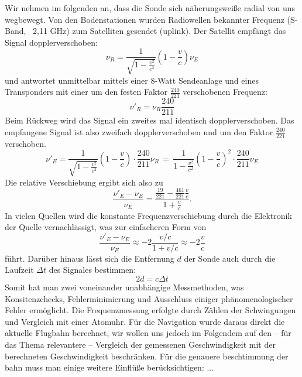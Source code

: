 \documentclass[a4paper,10pt]{article}
\begin{document}
Wir nehmen im folgenden an, dass die Sonde sich näherungsweiße radial von uns wegbewegt.
Von den Bodenstationen wurden Radiowellen bekannter Frequenz (S-Band, ~2,11 GHz) zum Satelliten gesendet (uplink).
Der Satellit empfängt das Signal dopplerverschoben:
\begin{equation}
 \nu_R = \frac{1}{\sqrt{1-\frac{v^2}{c^2}}}(1-\frac{v}{c})\nu_E
\end{equation}
und antwortet unmittelbar mittels einer 8-Watt Sendeanlage und eines Transponders
mit einer um den festen Faktor $ \frac{240}{221} $ verschobenen Frequenz:
\begin{equation}
\nu'_R = \nu_R\frac{240}{211}
\end{equation}
Beim Rückweg wird das Signal ein zweites mal identisch dopplerverschoben.
Das empfangene Signal ist also zweifach dopplerverschoben und um den Faktor $\frac{240}{221}$ verschoben.
\begin{equation}
 \nu'_E = \frac{1}{\sqrt{1-\frac{v^2}{c^2}}}(1-\frac{v}{c}) \cdot \frac{240}{211}\nu_R \, = \, \frac{1}{1-\frac{v^2}{c^2}}(1-\frac{v}{c})^2 \cdot \frac{240}{211} \nu_E
\end{equation}
Die relative Verschiebung ergibt sich also zu
\begin{equation}
 \frac{\nu'_E-\nu_E}{\nu_E} = \frac{\frac{19}{221}- \frac{461}{221}\frac{v}{c}}{1+\frac{v}{c}}.
\end{equation}
In vielen Quellen wird die konstante Frequenzverschiebung durch die Elektronik der Quelle vernachlässigt, was zur einfacheren Form von
\begin{equation}
 \frac{\nu'_E-\nu_E}{\nu_E} \approx -2\frac{v/c}{1+v/c} \approx -2 \frac{v}{c}
\end{equation}
führt.
Darüber hinaus lässt sich die Entfernung $d$ der Sonde auch durch die Laufzeit $\Delta t$ des Signales bestimmen:
\begin{equation}
 2d = c \Delta t
\end{equation}
Somit hat man zwei voneinander unabhängige Messmethoden, was Konsitenzchecks,
Fehlerminimierung und Ausschluss einiger phänomenologischer Fehler ermöglicht.
Die Frequenzmessung erfolgte durch Zählen der Schwingungen und Vergleich mit einer Atomuhr.\cite{Nieto2007} %
Für die Navigation wurde daraus direkt die aktuelle Flugbahn berechnet, wir wollen uns jedoch im Folgendem auf den – für das Thema relevantere – 
Vergleich der gemessenen Geschwindigkeit mit der berechneten Geschwindigkeit beschränken. %
Für die genauere beschtimmung der bahn muss man einige weitere Einflüße berücksichtigen:
...
\end{document}
